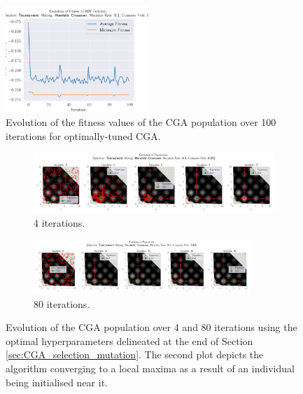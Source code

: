 \documentclass[10pt]{article}
\begin{document}
\begin{multicols}{2}
\begin{figure}[H]
    \centering
    \includegraphics[width=0.48\textwidth]{../figures/Permanent Images/0.1_0.65_Fitness.png}
    \captionsetup{justification=centering}
    \caption{Evolution of the fitness values of the CGA population over 100 iterations for optimally-tuned CGA.}
    \label{fig:CGA_fitness_evo_OPT}
\end{figure}
\end{multicols}
\begin{figure}[H]
    \centering
    \begin{subfigure}{0.9\textwidth}
        \centering
        \includegraphics[width=\textwidth]{../figures/Permanent Images/0.1_0.65_Population.png}
        \caption{4 iterations.}
        \label{fig:optimal_5}
    \end{subfigure}
    \begin{subfigure}{\textwidth}
        \centering
        \includegraphics[width=0.9\textwidth]{../figures/Permanent Images/0.1_0.65_Population100.png}
        \caption{80 iterations.}
        \label{fig:optimat_100}
    \end{subfigure}
    \captionsetup{justification=centering}
    \caption{Evolution of the CGA population over 4 and 80 iterations using the optimal hyperparameters delineated at the end of Section \ref{sec:CGA_selection_mutation}. The second plot depicts the algorithm converging to a local maxima as a result of an individual being initialised near it.}
    \label{fig:optimal_convergence}
\end{figure}
\end{document}
